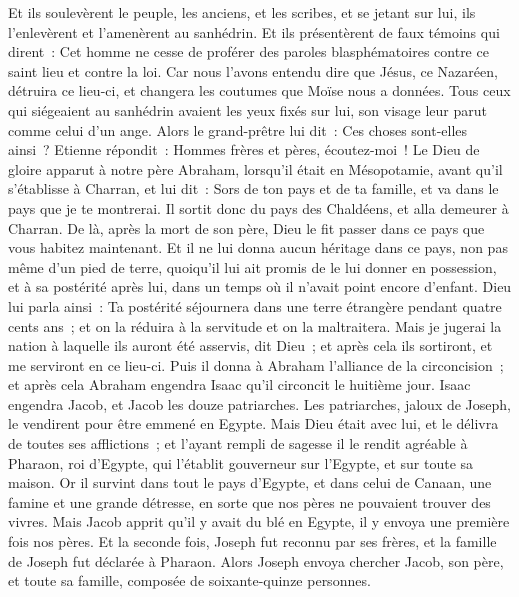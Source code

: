 \begin{multicols}{2}
Et ils soulevèrent le peuple, les anciens, et les scribes, et se jetant sur lui, ils l'enlevèrent et l'amenèrent au sanhédrin.
Et ils présentèrent de faux témoins qui dirent~: Cet homme ne cesse de proférer des paroles blasphématoires contre ce saint lieu et contre la loi.
Car nous l'avons entendu dire que Jésus, ce Nazaréen, détruira ce lieu-ci, et changera les coutumes que Moïse nous a données.
Tous ceux qui siégeaient au sanhédrin avaient les yeux fixés sur lui, son visage leur parut comme celui d'un ange.
\VerseOne{}Alors le grand-prêtre lui dit~: Ces choses sont-elles ainsi~?
Etienne répondit~: Hommes frères et pères, écoutez-moi~! Le Dieu de gloire apparut à notre père Abraham, lorsqu'il était en Mésopotamie, avant qu'il s'établisse à Charran, et lui dit~:
Sors de ton pays et de ta famille, et va dans le pays que je te montrerai.
Il sortit donc du pays des Chaldéens, et alla demeurer à Charran. De là, après la mort de son père, Dieu le fit passer dans ce pays que vous habitez maintenant.
Et il ne lui donna aucun héritage dans ce pays, non pas même d'un pied de terre, quoiqu'il lui ait promis de le lui donner en possession, et à sa postérité après lui, dans un temps où il n'avait point encore d'enfant.
Dieu lui parla ainsi~: Ta postérité séjournera dans une terre étrangère pendant quatre cents ans~; et on la réduira à la servitude et on la maltraitera.
Mais je jugerai la nation à laquelle ils auront été asservis, dit Dieu~; et après cela ils sortiront, et me serviront en ce lieu-ci.
Puis il donna à Abraham l'alliance de la circoncision~; et après cela Abraham engendra Isaac qu'il circoncit le huitième jour. Isaac engendra Jacob, et Jacob les douze patriarches.
Les patriarches, jaloux de Joseph, le vendirent pour être emmené en Egypte.
Mais Dieu était avec lui, et le délivra de toutes ses afflictions~; et l'ayant rempli de sagesse il le rendit agréable à Pharaon, roi d'Egypte, qui l'établit gouverneur sur l'Egypte, et sur toute sa maison.
Or il survint dans tout le pays d'Egypte, et dans celui de Canaan, une famine et une grande détresse, en sorte que nos pères ne pouvaient trouver des vivres.
Mais Jacob apprit qu'il y avait du blé en Egypte, il y envoya une première fois nos pères.
Et la seconde fois, Joseph fut reconnu par ses frères, et la famille de Joseph fut déclarée à Pharaon.
Alors Joseph envoya chercher Jacob, son père, et toute sa famille, composée de soixante-quinze personnes.

\end{multicols}
